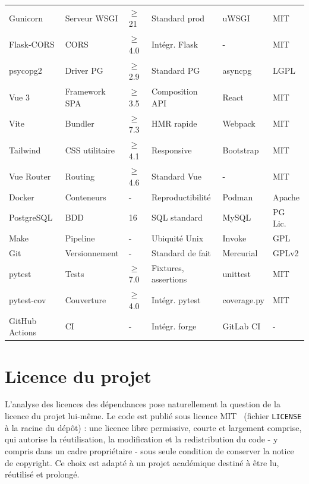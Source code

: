 \documentclass[12pt,a4paper,openany]{report}
\newcommand{\file}[1]{\texttt{#1}}
\begin{document}
{\begin{longtable}{R{2cm} R{2cm} R{1.2cm} R{3cm} R{2cm} R{1.2cm}}
    Gunicorn      & Serveur WSGI           & $\geq$21   & Standard prod        & uWSGI     & MIT \\
    Flask-CORS    & CORS                   & $\geq$4.0  & Intégr. Flask        & -       & MIT \\
    psycopg2      & Driver PG              & $\geq$2.9  & Standard PG          & asyncpg   & LGPL \\
    \midrule
    Vue 3         & Framework SPA          & $\geq$3.5  & Composition API      & React     & MIT \\
    Vite          & Bundler                & $\geq$7.3  & HMR rapide    & Webpack   & MIT \\
    Tailwind      & CSS utilitaire         & $\geq$4.1  & Responsive  & Bootstrap  & MIT \\
    Vue Router    & Routing                & $\geq$4.6  & Standard Vue                   & -               & MIT \\
    \midrule
    Docker        & Conteneurs             & -    & Reproductibilité   & Podman   & Apache \\
    PostgreSQL    & BDD                    & 16     & SQL standard       & MySQL    & PG Lic. \\
    Make          & Pipeline               & -    & Ubiquité Unix      & Invoke   & GPL \\
    Git           & Versionnement          & -    & Standard de fait   & Mercurial & GPLv2 \\
    \midrule
    pytest        & Tests                  & $\geq$7.0  & Fixtures, assertions   & unittest   & MIT \\
    pytest-cov    & Couverture             & $\geq$4.0  & Intégr. pytest    & coverage.py & MIT \\
    GitHub Actions & CI                    & -    & Intégr. forge      & GitLab CI & - \\
\end{longtable}
}

\section{Licence du projet}

L'analyse des licences des dépendances pose naturellement la question de la licence du projet lui-même. Le code est publié sous licence MIT~\cite{mit-license} (fichier \file{LICENSE} à la racine du dépôt) : une licence libre permissive, courte et largement comprise, qui autorise la réutilisation, la modification et la redistribution du code - y compris dans un cadre propriétaire - sous seule condition de conserver la notice de copyright. Ce choix est adapté à un projet académique destiné à être lu, réutilisé et prolongé.
\end{document}
